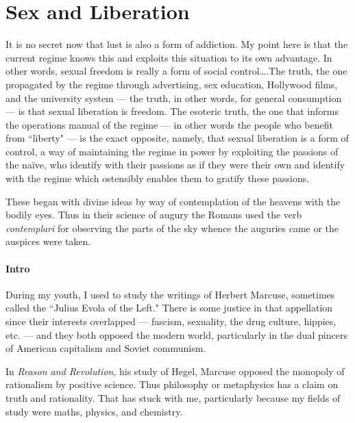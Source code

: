 \section{Sex and Liberation}

\begin{quotex}
It is no secret now that lust is also a form of addiction. My point here is that the current regime knows this and exploits this situation to its own advantage. In other words, sexual freedom is really a form of social control….The truth, the one propagated by the regime through advertising, sex education, Hollywood films, and the university system — the truth, in other words, for general consumption — is that sexual liberation is freedom. The esoteric truth, the one that informs the operations manual of the regime — in other words the people who benefit from ``liberty" — is the exact opposite, namely, that sexual liberation is a form of control, a way of maintaining the regime in power by exploiting the passions of the naïve, who identify with their passions as if they were their own and identify with the regime which ostensibly enables them to gratify these passions. 

These began with divine ideas by way of contemplation of the heavens with the bodily eyes. Thus in their science of augury the Romans used the verb \emph{contemplari} for observing the parts of the sky whence the auguries came or the auspices were taken. 

\end{quotex}
\paragraph{Intro}
During my youth, I used to study the writings of Herbert Marcuse, sometimes called the ``Julius Evola of the Left." There is some justice in that appellation since their interests overlapped — fascism, sexuality, the drug culture, hippies, etc. — and they both opposed the modern world, particularly in the dual pincers of American capitalism and Soviet communism.

In \emph{Reason and Revolution}, his study of Hegel, Marcuse opposed the monopoly of rationalism by positive science. Thus philosophy or metaphysics has a claim on truth and rationality. That has stuck with me, particularly because my fields of study were maths, physics, and chemistry.

